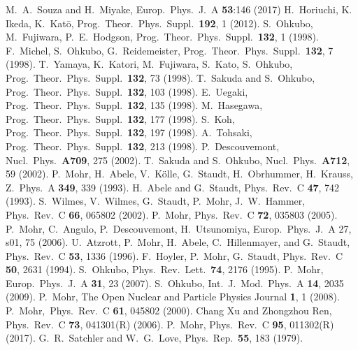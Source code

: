 \begin{thebibliography}{}
%
M.\ A.\ Souza and H.\ Miyake,
Europ.\ Phys.\ J.\ A {\bf 53}:146 (2017)
%
H.\ Horiuchi, K. Ikeda, K.\ Kat{\={o}},
Prog.\ Theor.\ Phys.\ Suppl.\ {\bf 192}, 1 (2012).
%
S.\ Ohkubo, M.\ Fujiwara, P.\  E.\ Hodgson,
Prog.\ Theor.\ Phys.\ Suppl.\ {\bf 132}, 1 (1998).
%
F.\ Michel, S.\ Ohkubo, G.\ Reidemeister,
Prog.\ Theor.\ Phys.\ Suppl.\ {\bf 132}, 7 (1998).
%
T.\ Yamaya, K.\ Katori, M.\ Fujiwara, S.\ Kato, S.\ Ohkubo,
Prog.\ Theor.\ Phys.\ Suppl.\ {\bf 132}, 73 (1998).
%
T.\ Sakuda and S.\ Ohkubo,
Prog.\ Theor.\ Phys.\ Suppl.\ {\bf 132}, 103 (1998).
%
E.\ Uegaki,
Prog.\ Theor.\ Phys.\ Suppl.\ {\bf 132}, 135 (1998).
%
M.\ Hasegawa,
Prog.\ Theor.\ Phys.\ Suppl.\ {\bf 132}, 177 (1998).
%
S.\ Koh,
Prog.\ Theor.\ Phys.\ Suppl.\ {\bf 132}, 197 (1998).
%
A.\ Tohsaki,
Prog.\ Theor.\ Phys.\ Suppl.\ {\bf 132}, 213 (1998).
%
P.\ Descouvemont,
Nucl.\ Phys.\ {\bf A709}, 275 (2002).
%
T.\ Sakuda and S.\ Ohkubo,
Nucl.\ Phys.\ {\bf A712}, 59 (2002).
%
P.\ Mohr, H.\ Abele, V.\ K\"olle, G.\ Staudt, H.\ Obrhummer, H.\ Krauss,
Z.\ Phys.\ A {\bf 349}, 339 (1993).
%
H.\ Abele and G.\ Staudt,
Phys.\ Rev.\ C {\bf 47}, 742 (1993).
%
S.~Wilmes, V.~Wilmes, G.~Staudt, P.~Mohr, J.~W.~Hammer,
Phys.\ Rev.\ C {\bf {66}}, 065802 (2002).
%
P.\ Mohr,
Phys.\ Rev.\ C {\bf 72}, 035803 (2005).
%
P.\ Mohr, C.\ Angulo, P.\ Descouvemont, H.\ Utsunomiya,
Europ.\ Phys.\ J.\ A 27, s01, 75 (2006).
%
  U.\ Atzrott, P.\ Mohr, H.\ Abele, C.\ Hillenmayer, and
  G.\ Staudt,
  Phys.\ Rev.\ C {\bf 53}, 1336 (1996).
%
F.\ Hoyler, P.\ Mohr, G.\ Staudt,
Phys.\ Rev.\ C {\bf 50}, 2631 (1994).
%
S.\ Ohkubo,
Phys.\ Rev.\ Lett.\ {\bf 74}, 2176 (1995).
%
P.\ Mohr,
Europ.\ Phys.\ J.\ A {\bf 31}, 23 (2007).
%
S.\ Ohkubo,
Int.\ J.\ Mod.\ Phys.\ A {\bf 14}, 2035 (2009).
%
P.\ Mohr,
The Open Nuclear and Particle Physics Journal {\bf 1}, 1 (2008).
%
P.\ Mohr,\ Phys.\ Rev.\ C {\bf 61}, 045802 (2000).
%
Chang Xu and Zhongzhou Ren,
Phys.\ Rev.\ C {\bf 73}, 041301(R) (2006).
%
P.\ Mohr,
Phys.\ Rev.\ C {\bf 95}, 011302(R) (2017).
%
G.\ R.\ Satchler and W.\ G.\ Love,
Phys.\ Rep.\ {\bf 55}, 183 (1979).
%

\end{thebibliography}
